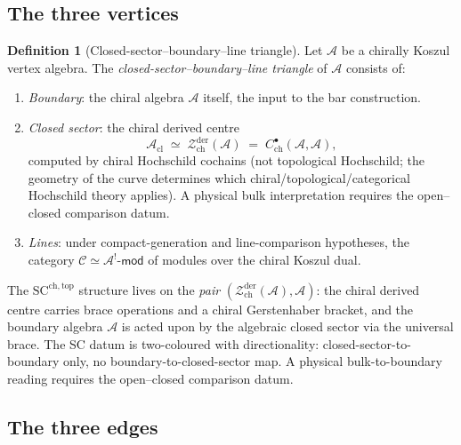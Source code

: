 \documentclass[11pt,reqno]{amsart}
\theoremstyle{definition}
\newtheorem{definition}[theorem]{Definition}
\theoremstyle{remark}
\newcommand{\cA}{\mathcal{A}}
\newcommand{\cC}{\mathcal{C}}
\newcommand{\cZ}{\mathcal{Z}}
\newcommand{\SCchtop}{\mathrm{SC}^{\mathrm{ch,top}}}
\numberwithin{equation}{section}
\begin{document}
\subsection{The three vertices}\label{subsec:vertices}

\begin{definition}[Closed-sector--boundary--line triangle]\label{def:bbl}
Let $\cA$ be a chirally Koszul vertex algebra. The
\emph{closed-sector--boundary--line triangle} of $\cA$ consists of:
\begin{enumerate}[label=(\roman*),nosep]
\item \emph{Boundary}: the chiral algebra $\cA$ itself, the
  input to the bar construction.
\item \emph{Closed sector}: the chiral derived centre
  \begin{equation}\label{eq:closed-sector}
  \cA_{\mathrm{cl}}
  \;\simeq\;
  \cZ^{\mathrm{der}}_{\mathrm{ch}}(\cA)
  \;=\;
  C^\bullet_{\mathrm{ch}}(\cA, \cA),
  \end{equation}
  computed by chiral Hochschild cochains (not topological Hochschild;
  the geometry of the curve determines which
  chiral/topological/categorical Hochschild theory applies). A physical
  bulk interpretation requires the open--closed comparison datum.
\item \emph{Lines}: under compact-generation and line-comparison
  hypotheses, the category
  $\cC \simeq \cA^!\text{-}\mathsf{mod}$ of modules over the
  chiral Koszul dual.
\end{enumerate}
\end{definition}

The $\SCchtop$ structure lives on the \emph{pair}
$(\cZ^{\mathrm{der}}_{\mathrm{ch}}(\cA), \cA)$: the chiral
derived centre carries brace operations and a chiral Gerstenhaber
bracket, and the boundary algebra $\cA$ is acted upon by the
algebraic closed sector via the universal brace. The SC datum is
two-coloured with directionality: closed-sector-to-boundary only, no
boundary-to-closed-sector map. A physical bulk-to-boundary reading
requires the open--closed comparison datum.


\subsection{The three edges}\label{subsec:edges}
\end{document}
